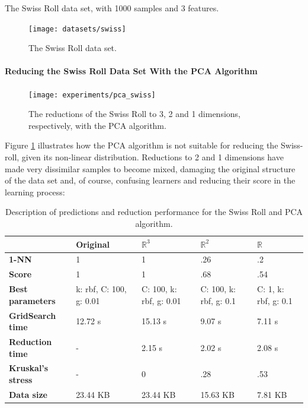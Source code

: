 The Swiss Roll data set, with 1000 samples and 3 features.
\newline\newline

\begin{figure}[H]
	\centering
	\texttt{[image: datasets/swiss]}
	\captionsetup{justification=centering}
	\caption{The Swiss Roll data set.}
\end{figure}

\newpage
\paragraph{Reducing the Swiss Roll Data Set With the PCA Algorithm}

\begin{figure}[H]
	\centering
	\captionsetup{justification=centering}
	\texttt{[image: experiments/pca\_swiss]}
	\caption{The reductions of the Swiss Roll to 3, 2 and 1 dimensions, respectively, with the PCA algorithm.}
	\label{fig:dsswisspca}
\end{figure}

Figure \ref{fig:dsswisspca} illustrates how the PCA algorithm is not suitable for reducing the Swiss-roll, given its non-linear distribution. Reductions to 2 and 1 dimensions have made very dissimilar samples to become mixed, damaging the original structure of the data set and, of course, confusing learners and reducing their score in the learning process:

\begin{table}[H]
	\centering
	
	\begin{tabular}{|p{.20\linewidth}|p{.15\linewidth}|p{.15\linewidth}|p{.15\linewidth}|p{.15\linewidth}|}
		\hline
		& \textbf{Original} & $\mathbb{R}^3$ & $\mathbb{R}^2$ & $\mathbb{R}$ \\\hline
		\textbf{1-NN} & 1 & 1 & .26 & .2 \\\hline
		\textbf{Score} & 1 & 1 & .68 & .54 \\\hline
		\textbf{Best parameters} & k: rbf, C: 100, g: 0.01 & C: 100, k: rbf, g: 0.01 & C: 100, k: rbf, g: 0.1 & C: 1, k: rbf, g: 0.1\\\hline
		\textbf{GridSearch time} & 12.72 s & 15.13 s & 9.07 s & 7.11 s \\\hline
		\textbf{Reduction time} & - & 2.15 s & 2.02 s & 2.08 s\\\hline
		\textbf{Kruskal's stress} & - & 0 & .28 & .53 \\\hline
		\textbf{Data size} & 23.44 KB & 23.44 KB & 15.63 KB & 7.81 KB \\\hline
	\end{tabular}
	\captionsetup{justification=centering}
	\caption{Description of predictions and reduction performance for the Swiss Roll and PCA algorithm.}
\end{table}

